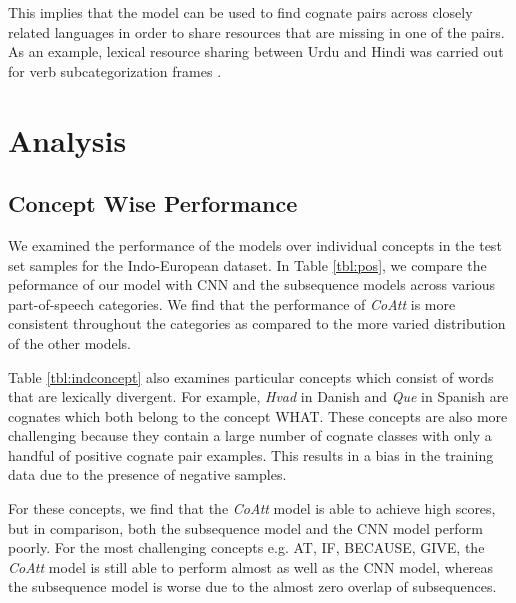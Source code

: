 \documentclass[11pt,letterpaper]{article}
\begin{document}
This implies that the model can be used to find cognate pairs across closely related languages in order to share resources that are missing in one of the pairs. As an example, lexical resource sharing between Urdu and Hindi was carried out for verb subcategorization frames \cite{bhat-EtAl:2014:LT4CloseLang}.

\section{Analysis}

\subsection{Concept Wise Performance}

We examined the performance of the models over individual concepts in the test set samples for the Indo-European dataset. In Table \ref{tbl:pos}, we compare the peformance of our model with CNN and the subsequence models across various part-of-speech categories. We find that the performance of \textit{CoAtt} is more consistent throughout the categories as compared to the more varied distribution of the other models. 

Table \ref{tbl:indconcept} also examines particular concepts which consist of words that are lexically divergent. For example, \textit{Hvad} in Danish and \textit{Que} in Spanish are cognates which both belong to the concept WHAT. These concepts are also more challenging because they contain a large number of cognate classes with only a handful of positive cognate pair examples. This results in a bias in the training data due to the presence of negative samples. 

For these concepts, we find that the \textit{CoAtt} model is able to achieve high scores, but in comparison, both the subsequence model and the CNN model perform poorly. For the most challenging concepts e.g. AT, IF, BECAUSE, GIVE, the \textit{CoAtt} model is still able to perform almost as well as the CNN model, whereas the subsequence model is worse due to the almost zero overlap of subsequences.
\end{document}
